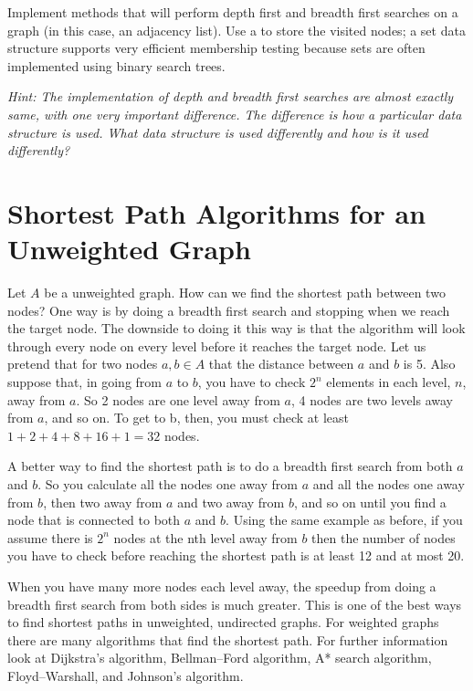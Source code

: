 \begin{problem}
Implement methods that will perform depth first and breadth first searches on a graph (in this case, an adjacency list).
Use a  to store the visited nodes;
a set data structure supports very efficient membership testing because
sets are often implemented using binary search trees.

\textit{Hint: The implementation of depth and breadth first searches are almost exactly same, with one very important difference.
The difference is how a particular data structure is used.  What data structure is used differently and how is it used differently?}
\end{problem}

\section*{Shortest Path Algorithms for an Unweighted Graph}
Let $A$ be a unweighted graph. How can we find the shortest path between two nodes?  One way is by doing a breadth first search and stopping when we reach the target node. The downside to doing it this way is that the algorithm will look through every node on every level before it reaches the target node. Let us pretend that for two nodes $a, b \in A$ that the distance between $a$ and $b$ is 5. Also suppose that, in going from $a$ to $b$, you have to check $2^n$ elements in each level, $n$, away from $a$. So 2 nodes are one level away from $a$, 4 nodes are two levels away from $a$, and so on. To get to  b, then, you must check at least $1 + 2 + 4 + 8 + 16 + 1 = 32$ nodes.

A better way to find the shortest path is to do a breadth first search from both $a$ and $b$. So you calculate all the nodes one away from $a$ and all the nodes one away from $b$, then two away from $a$ and two away from $b$, and so on until you find a node that is connected to both $a$ and $b$. Using the same example as before, if you assume there is $2^n$ nodes at the nth level away from $b$ then the number of nodes you have to check before reaching the shortest path is at least 12 and at most 20.

When you have many more nodes each level away, the speedup from doing a breadth first search from both sides is much greater. This is one of the best ways to find shortest paths in unweighted, undirected graphs. For weighted graphs there are many algorithms that find the shortest path. For further information look at Dijkstra's algorithm, Bellman–Ford algorithm, A* search algorithm, Floyd–Warshall, and Johnson's algorithm.

